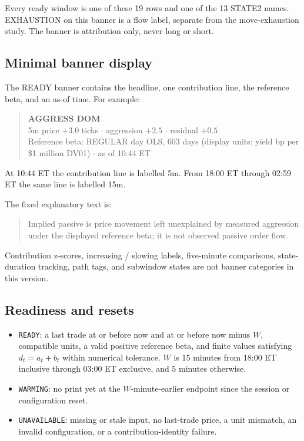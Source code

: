 \documentclass[11pt]{article}
\newcommand{\Warming}{\texttt{WARMING}}
\newcommand{\Unavailable}{\texttt{UNAVAILABLE}}
\begin{document}
Every ready window is one of these 19 rows and one of the 13 STATE2 names. EXHAUSTION on this banner is a flow label, separate from the move-exhaustion study. The banner is attribution only, never long or short.

\subsection{Minimal banner display}

The READY banner contains the headline, one contribution line, the reference beta, and an as-of time. For example:
\begin{quote}
\textbf{AGGRESS DOM}\\
5m price $+3.0$ ticks $\cdot$ aggression $+2.5$ $\cdot$ residual $+0.5$\\
Reference beta: REGULAR day OLS, 603 days (display units: yield bp per \$1 million DV01) $\cdot$ as of 10:44 ET
\end{quote}

At 10:44 ET the contribution line is labelled 5m. From 18:00 ET through 02:59 ET the same line is labelled 15m.

The fixed explanatory text is:
\begin{quote}
Implied passive is price movement left unexplained by measured aggression under the displayed reference beta; it is not observed passive order flow.
\end{quote}

Contribution z-scores, increasing / slowing labels, five-minute comparisons, state-duration tracking, path tags, and subwindow states are not banner categories in this version.

\subsection{Readiness and resets}

\begin{itemize}
    \item \texttt{READY}: a last trade at or before now and at or before now minus $W$, compatible units, a valid positive reference beta, and finite values satisfying $d_t=a_t+b_t$ within numerical tolerance. $W$ is 15 minutes from 18:00 ET inclusive through 03:00 ET exclusive, and 5 minutes otherwise.
    \item \Warming: no print yet at the $W$-minute-earlier endpoint since the session or configuration reset.
    \item \Unavailable: missing or stale input, no last-trade price, a unit mismatch, an invalid configuration, or a contribution-identity failure.
\end{itemize}
\end{document}

